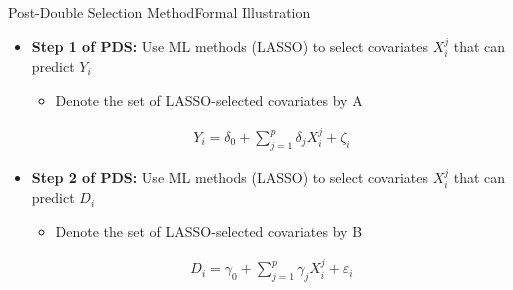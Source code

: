 \documentclass[hyperref={pdfpagelabels=false}]{beamer}
\begin{document}
\begin{frame}{Post-Double Selection Method}{Formal Illustration}
	
	\begin{itemize}
	
		
		
		\item \textbf{Step 1 of PDS:} Use ML methods (LASSO) to select covariates $X^{j}_{i}$ that can predict $Y_{i}$
				\vspace{0.3cm}
				\begin{itemize}
		\item Denote the set of LASSO-selected covariates by A
			\end{itemize}
		\begin{eqnarray*}
			Y_{i} = \delta_{0} + \sum^{p}_{j=1} \delta_{j} X^{j}_{i}  + \zeta_{i}
		\end{eqnarray*}
		
		
		\vspace{0.3cm}
		\item \textbf{Step 2 of PDS:} Use ML methods (LASSO) to select covariates $X^{j}_{i}$ that can predict $D_{i}$ 
						\vspace{0.3cm}
							\begin{itemize}			
				\item Denote the set of LASSO-selected covariates by B
					\end{itemize}
		\begin{eqnarray*}
			D_{i} = \gamma_{0} +  \sum^{p}_{j=1} \gamma_{j} X^{j}_{i}  + \varepsilon_{i}
		\end{eqnarray*}
		
		
	\end{itemize}
	
\end{frame}
\end{document}
